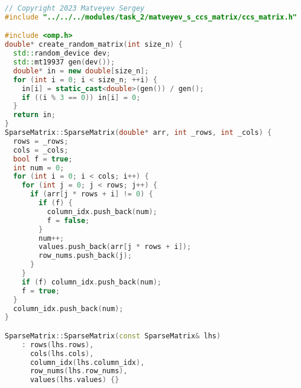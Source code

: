 \documentclass{report}
\begin{document}
\begin{lstlisting}[language=C++]
// Copyright 2023 Matveyev Sergey
#include "../../../modules/task_2/matveyev_s_ccs_matrix/ccs_matrix.h"

#include <omp.h>
double* create_random_matrix(int size_n) {
  std::random_device dev;
  std::mt19937 gen(dev());
  double* in = new double[size_n];
  for (int i = 0; i < size_n; ++i) {
    in[i] = static_cast<double>(gen()) / gen();
    if ((i % 3 == 0)) in[i] = 0;
  }
  return in;
}
SparseMatrix::SparseMatrix(double* arr, int _rows, int _cols) {
  rows = _rows;
  cols = _cols;
  bool f = true;
  int num = 0;
  for (int i = 0; i < cols; i++) {
    for (int j = 0; j < rows; j++) {
      if (arr[j * rows + i] != 0) {
        if (f) {
          column_idx.push_back(num);
          f = false;
        }
        num++;
        values.push_back(arr[j * rows + i]);
        row_nums.push_back(j);
      }
    }
    if (f) column_idx.push_back(num);
    f = true;
  }
  column_idx.push_back(num);
}

SparseMatrix::SparseMatrix(const SparseMatrix& lhs)
    : rows(lhs.rows),
      cols(lhs.cols),
      column_idx(lhs.column_idx),
      row_nums(lhs.row_nums),
      values(lhs.values) {}


\end{lstlisting}
\end{document}

